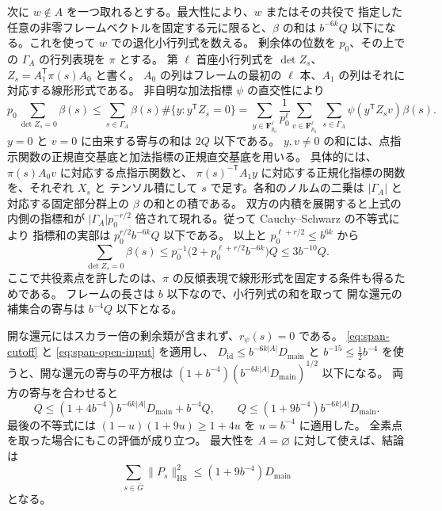 次に \(w\notin A\) を一つ取れるとする。最大性により、\(w\) またはその共役で
指定した任意の非零フレームベクトルを固定する元に限ると、\(\beta\) の和は
\(b^{-6k}Q\) 以下になる。これを使って \(w\) での退化小行列式を数える。
剰余体の位数を \(p_0\)、その上での \(\Gamma_A\) の行列表現を \(\pi\) とする。
第 \(\ell\) 首座小行列式を
\(\det Z_s\)、\(Z_s=A_1^{\mathsf T}\pi(s)A_0\) と書く。
\(A_0\) の列はフレームの最初の \(\ell\) 本、\(A_1\) の列はそれに対応する線形形式である。
非自明な加法指標 \(\psi\) の直交性により
\[
 p_0 \sum_{\det Z_s=0}\beta(s)
 \le \sum_{s\in\Gamma_A}\beta(s)\#\{y:y^{\mathsf T}Z_s=0\}
 = \sum_{y\in\mathbf F_{p_0}^\ell}\frac{1}{p_0^\ell}
    \sum_{v\in\mathbf F_{p_0}^\ell}\ \sum_{s\in\Gamma_A}
        \psi(y^{\mathsf T}Z_s v)\beta(s).
\]
\(y=0\) と \(v=0\) に由来する寄与の和は \(2Q\) 以下である。
\(y,v\ne0\) の和には、点指示関数の正規直交基底と加法指標の正規直交基底を用いる。
具体的には、\(\pi(s)A_0v\) に対応する点指示関数と、
\(\pi(s)^{-\mathsf T}A_1y\) に対応する正規化指標の関数を、それぞれ \(X_s\) と
テンソル積にして \(s\) で足す。各和のノルムの二乗は
\(|\Gamma_A|\) と対応する固定部分群上の \(\beta\) の和との積である。
双方の内積を展開すると上式の内側の指標和が
\(|\Gamma_A|p_0^{-r/2}\) 倍されて現れる。従って Cauchy--Schwarz の不等式により
指標和の実部は \(p_0^{r/2}b^{-6k}Q\) 以下である。
以上と \(p_0^{\ell+r/2}\le b^{6k}\) から
\[
  \sum_{\det Z_s=0}\beta(s)
  \le p_0^{-1}\bigl(2+p_0^{\ell+r/2}b^{-6k}\bigr)Q
  \le 3b^{-10}Q .
\]
ここで共役素点を許したのは、\(\pi\) の反傾表現で線形形式を固定する条件も得るためである。
フレームの長さは \(b\) 以下なので、小行列式の和を取って
開な還元の補集合の寄与は \(b^{-4}Q\) 以下となる。

開な還元にはスカラー倍の剰余類が含まれず、\(r_\psi(s)=0\) である。
\eqref{eq:span-cutoff} と \eqref{eq:span-open-input} を適用し、
\(D_{\mathrm{id}}\le b^{-6k|A|}D_{\mathrm{main}}\) と
\(b^{-15}\le\tfrac12 b^{-4}\) を使うと、開な還元の寄与の平方根は
\((1+b^{-4})(b^{-6k|A|}D_{\mathrm{main}})^{1/2}\) 以下になる。
両方の寄与を合わせると
\[
 Q \leq (1+4b^{-4})b^{-6k|A|}D_{\mathrm{main}}+b^{-4}Q,
 \qquad
 Q\leq (1+9b^{-4})b^{-6k|A|}D_{\mathrm{main}}.
\]
最後の不等式には \((1-u)(1+9u)\ge1+4u\) を \(u=b^{-4}\) に適用した。
全素点を取った場合にもこの評価が成り立つ。
最大性を \(A=\varnothing\) に対して使えば、結論は
\begin{equation}\label{eq:span-second-moment}
 \sum_{s\in\bar G}\|P_s\|_{\mathrm{HS}}^2
    \leq (1+9b^{-4})D_{\mathrm{main}}
\end{equation}
となる。

